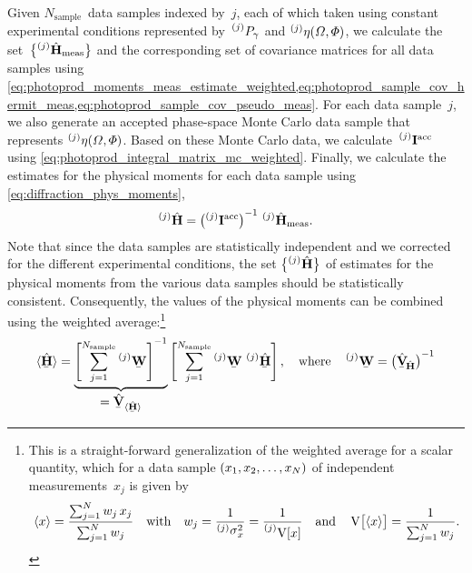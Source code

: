 Given $N_\text{sample}$~data samples indexed by~$j$, each of which
taken using constant experimental conditions represented
by~$\prescript{(j)}{}{P_\gamma}$ and $\prescript{(j)}{}{\eta}(\Omega,
\Phi)$, we calculate the
set~$\Set[1]{\prescript{(j)}{}{\vphantom{\vect{H}}}\hat{\vect{H}}_\text{meas}}$
and the corresponding set of covariance matrices for all data samples
using
\cref{eq:photoprod_moments_meas_estimate_weighted,eq:photoprod_sample_cov_hermit_meas,eq:photoprod_sample_cov_pseudo_meas}.
For each data sample~$j$, we also generate an accepted phase-space
Monte Carlo data sample that represents $\prescript{(j)}{}{\eta}(\Omega, \Phi)$.
Based on these Monte Carlo data, we
calculate~$\prescript{(j)}{}{\ensuremath{\bm{\mathrm{I}}}}^\text{acc}$ using
\cref{eq:photoprod_integral_matrix_mc_weighted}.  Finally, we
calculate the estimates for the physical moments for each data sample
using \cref{eq:diffraction_phys_moments}, \ie
\begin{equation}
  \prescript{(j)}{}{\vphantom{\vect{H}}}\hat{\vect{H}}
  = \rBrk[1]{\prescript{(j)}{}{\mat{I}}^\text{acc}}^{-1}\, \prescript{(j)}{}{\vphantom{\vect{H}}}\hat{\vect{H}}_\text{meas}.
\end{equation}
Note that since the data samples are statistically independent and we
corrected for the different experimental conditions, the set
$\Set[1]{\prescript{(j)}{}{\vphantom{\vect{H}}}\hat{\vect{H}}}$ of
estimates for the physical moments from the various data samples
should be statistically consistent.  Consequently, the values of the
physical moments can be combined using the weighted
average:\footnote{%
This is a straight-forward generalization of the weighted average for
a scalar quantity, which for a data sample $({x_1, x_2, \ldots,
x_N})$ of independent measurements~$x_j$ is given by
\begin{equation}
  \mean{x}
  = \frac{\sum_{j = 1}^N w_j\, x_j}{\sum_{j = 1}^N w_j}
  \quad\text{with}\quad
  w_j = \frac{1}{\prescript{(j)}{}{\sigma}_x^2} = \frac{1}{\prescript{(j)}{}{\var{x}}}
  \quad\text{and}\quad
  \var{\mean{x}} = \frac{1}{\sum_{j = 1}^N w_j}.
\end{equation}}
\begin{equation}
  \label{eq:photoprod_datasets_weighted_average}
  \mean{\underaccent{\bar}{\hat{\vect{H}}}}
  = \dUnderbrace{\sBrk[4]{\sum_{j = 1}^{N_\text{sample}} \prescript{(j)}{}{\underaccent{\bar}{\mat{W}}}}^{-1}}{= \hat{\underaccent{\bar}{\covMatSym}}_{\mean{\underaccent{\bar}{\hat{\vect{H}}}}}}
  \sBrk[4]{\sum_{j = 1}^{N_\text{sample}} \prescript{(j)}{}{\underaccent{\bar}{\mat{W}}}\,
  \prescript{(j)}{}{\vphantom{\vect{H}}}\underaccent{\bar}{\hat{\vect{H}}}},
  \quad\text{where}\quad
  \prescript{(j)}{}{\underaccent{\bar}{\mat{W}}}
  = \rBrk[1]{\hat{\underaccent{\bar}{\covMatSym}}_{\!\hat{\vect{H}}}}^{-1}
\end{equation}
